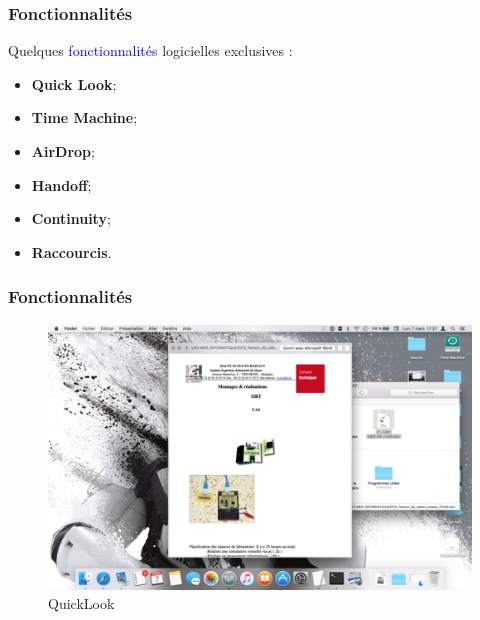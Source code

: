 \documentclass[aspectratio=169]{beamer}
\begin{document}
\begin{frame}
  \frametitle{Fonctionnalités}
  Quelques \textcolor{blue}{fonctionnalités} logicielles exclusives : \\

  \begin{itemize}
  \item \textbf{Quick Look}; \\

  \item \textbf{Time Machine}; \\

  \item \textbf{AirDrop}; \\

  \item \textbf{Handoff}; \\

  \item \textbf{Continuity}; \\

  \item \textbf{Raccourcis}. \\
  \end{itemize}
\end{frame}

\begin{frame}
  \frametitle{Fonctionnalités}
  \begin{figure}[!h]
    \center
    \includegraphics[scale=0.22]
    {textures/images/mac/features/QuickLook.png}
    \caption{QuickLook}
  \end{figure}
\end{frame}
\end{document}

